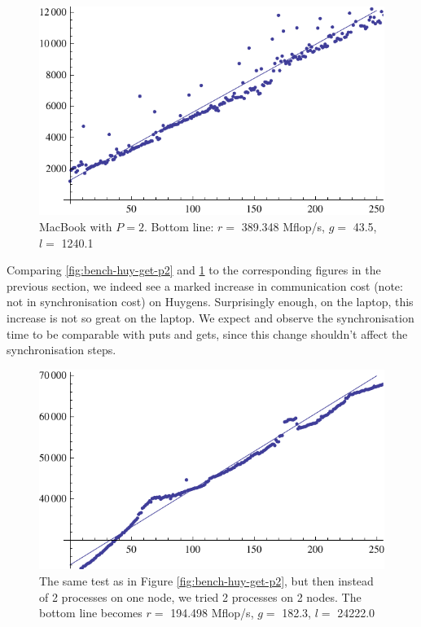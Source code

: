 \documentclass[a4paper]{article}
\begin{document}
\begin{figure}[h]
    \begin{center}
        \includegraphics{img/bench-laptop-get.pdf}
    \end{center}
    \caption{MacBook with $P=2$. Bottom line: $r=$ 389.348 Mflop/s, $g=$ 43.5, $l=$ 1240.1}
    \label{fig:bench-laptop-get-p2}
\end{figure}

Comparing \ref{fig:bench-huy-get-p2} and \ref{fig:bench-laptop-get-p2} to the
corresponding figures in the previous section, we indeed see a marked increase
in communication cost (note: not in synchronisation cost) on Huygens. Surprisingly enough, on the laptop, this
increase is not so great on the laptop. We expect and observe the
synchronisation time to be comparable with puts and gets, since this change
shouldn't affect the synchronisation steps. 

\begin{figure}[h]
    \begin{center}
        \includegraphics{img/bench-huy-get-p2-dist.pdf}
    \end{center}
    \caption{The same test as in Figure \ref{fig:bench-huy-get-p2}, but then
    instead of 2 processes on one node, we tried 2 processes on 2 nodes. The
    bottom line becomes $r=$ 194.498 Mflop/s, $g=$ 182.3, $l=$ 24222.0}
    \label{fig:bench-huy-get-p2-dist}
\end{figure}
\end{document}
